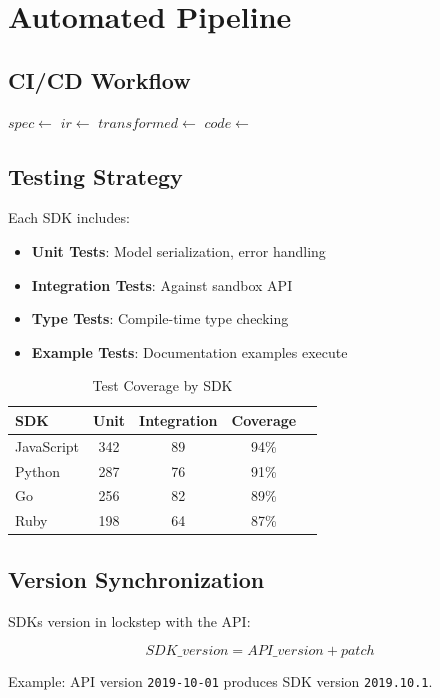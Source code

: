 \section{Automated Pipeline}


\subsection{CI/CD Workflow}

\begin{algorithm}
\caption{SDK Release Pipeline}
\begin{algorithmic}[1]
    \State $spec \gets$ 
    \State $ir \gets$ 
        \State $transformed \gets$ 
        \State $code \gets$ 
        \State {}
        \State {}
        \State {}
        \State {}
    \EndFor
\EndFunction
\end{algorithmic}
\end{algorithm}

\subsection{Testing Strategy}

Each SDK includes:

\begin{itemize}
    \item \textbf{Unit Tests}: Model serialization, error handling
    \item \textbf{Integration Tests}: Against sandbox API
    \item \textbf{Type Tests}: Compile-time type checking
    \item \textbf{Example Tests}: Documentation examples execute
\end{itemize}

\begin{table}[h]
\centering
\caption{Test Coverage by SDK}
\begin{tabular}{lcccc}
\toprule
\textbf{SDK} & \textbf{Unit} & \textbf{Integration} & \textbf{Coverage} \\
\midrule
JavaScript & 342 & 89 & 94\% \\
Python & 287 & 76 & 91\% \\
Go & 256 & 82 & 89\% \\
Ruby & 198 & 64 & 87\% \\
\bottomrule
\end{tabular}
\end{table}

\subsection{Version Synchronization}

SDKs version in lockstep with the API:

\begin{equation}
SDK\_version = API\_version + patch
\end{equation}

Example: API version \texttt{2019-10-01} produces SDK version \texttt{2019.10.1}.


